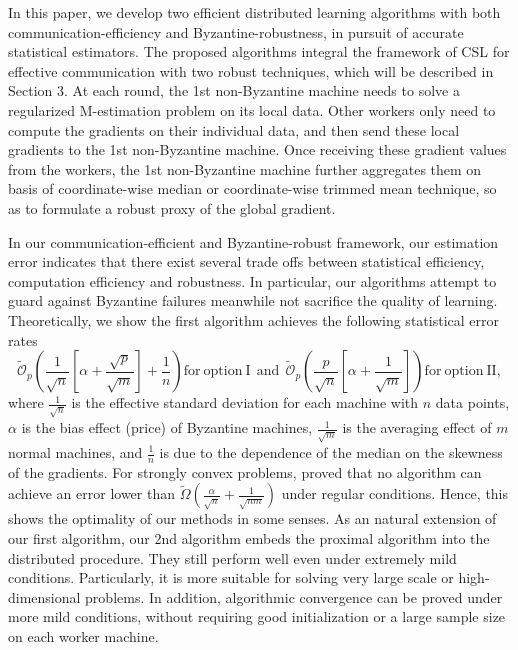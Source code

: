 \documentclass[12pt,a4paper]{article}%
\numberwithin{equation}{section}
\newcommand{\sbr}[1]{\left(#1\right)}        %
\newcommand{\mbr}[1]{\left[#1\right]}        %
\begin{document}
In this paper, we  develop two efficient distributed learning algorithms with both communication-efficiency and Byzantine-robustness,  in pursuit of
accurate statistical estimators. The proposed algorithms integral the framework of CSL for effective communication with two robust techniques, which will be described in Section 3. At each round,  the 1st non-Byzantine machine needs to solve a regularized M-estimation problem on its local data. Other workers only need to compute the gradients on their individual data, and then send these local gradients to the 1st non-Byzantine machine. Once receiving these gradient values from the workers,  the 1st non-Byzantine machine further aggregates them  on basis of coordinate-wise median or coordinate-wise trimmed mean technique,  so as to formulate a robust proxy of the  global gradient.

In our communication-efficient and Byzantine-robust framework, our estimation error indicates that there exist several trade offs between statistical efficiency, computation efficiency and robustness. In particular, our algorithms attempt to guard against Byzantine failures meanwhile  not sacrifice the quality of learning. Theoretically, we show the first algorithm achieves the following statistical error rates
$$
\mathcal{\tilde{O}}_p\sbr{\frac{1}{\sqrt{n}}\mbr{\alpha+\frac{\sqrt{p}}{\sqrt{m}}}+\frac{1}{n}}  \mathrm{for~ option~ I ~~and}~~
\mathcal{\tilde{O}}_p\sbr{\frac{p}{\sqrt{n}}\mbr{\alpha+\frac{1}{\sqrt{m}}}} \mathrm{for~ option~ II,}
$$
where $\frac{1}{\sqrt{n}}$ is the effective standard deviation for each machine with $n$ data points, $\alpha$ is the bias effect (price) of Byzantine machines, $\frac{1}{\sqrt{m}}$ is the averaging effect of $m$ normal machines, and $\frac{1}{n}$ is due to the dependence of the median on the skewness of the gradients. For strongly convex problems,   \cite{YinChenRB2018} proved that no algorithm can achieve an error lower than $\tilde{\Omega}\sbr{\frac{\alpha}{\sqrt{n}}+\frac{1}{\sqrt{nm}}}$ under regular conditions. Hence, this shows  the optimality of our methods  in some senses. As an natural extension of our first algorithm, our 2nd algorithm embeds the proximal algorithm \citep{ParikhBoyd2014} into the distributed procedure. They still perform well even under extremely mild conditions. Particularly,  it is more suitable for solving  very large scale or high-dimensional problems. In addition, algorithmic convergence  can be proved under more mild conditions, without requiring good initialization or a large sample size on each worker machine.
\end{document}
